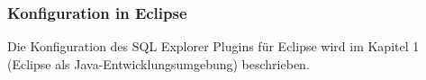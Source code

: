 \subsubsection{Konfiguration in Eclipse}

Die Konfiguration des SQL Explorer Plugins für Eclipse wird im Kapitel 1
(Eclipse als Java-Entwicklungsumgebung) beschrieben.


% 
% 
% 
% 
% 
% 
% 
% 
% 
% 
% 
% 
% 
